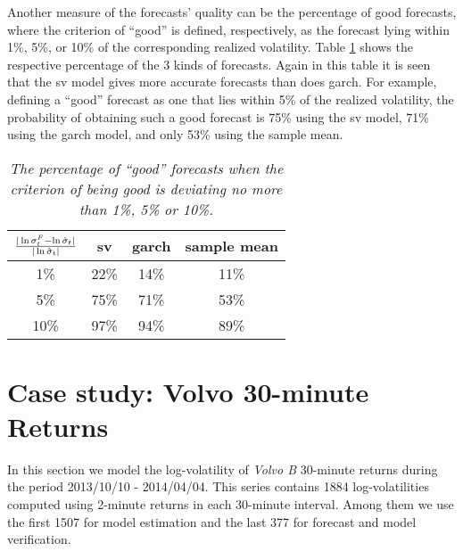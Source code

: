 Another measure of the forecasts' quality can be the percentage of good
forecasts, where the criterion of ``good'' is defined, respectively,
as the forecast lying within 1\%, 5\%, or 10\% of the corresponding
realized volatility. Table \ref{tab:nordea_2012_good} shows the
respective percentage of the 3 kinds of forecasts. Again in this table
it is seen that the \gls{sv} model gives more accurate forecasts than does
\gls{garch}. For example, defining a ``good'' forecast as one that lies
within 5\% of the realized volatility, the probability of obtaining
such a good forecast is 75\% using the \gls{sv} model, 71\% using the
\gls{garch} model, and only 53\% using the sample mean.
\begin{table}[htb!]
  \centering
  \begin{tabular}{|c|c|c|c|}
    \hline
    ${|\ln \sigma^F_t - \ln \hat{\sigma}_t| \over |\ln \hat{\sigma}_t|}$
    & \gls{sv} & \gls{garch} & sample mean \\
    \hline
    1\% & 22\% & 14\% & 11\% \\
    \hline
    5\% & 75\% & 71\% & 53\% \\
    \hline
    10\% & 97\% & 94\% & 89\% \\
    \hline
  \end{tabular}
  \caption{\small \it The percentage of ``good'' forecasts when the
    criterion of being good is deviating no more than 1\%, 5\% or
    10\%.}
  \label{tab:nordea_2012_good}
\end{table}

\section{Case study: Volvo 30-minute Returns}
\label{sec:volvo_30}
In this section we model the log-volatility of {\it Volvo B} 30-minute
returns during the period 2013/10/10 - 2014/04/04. This series
contains 1884 log-volatilities computed using 2-minute returns in each
30-minute interval. Among them we use the first 1507 for model
estimation and the last 377 for forecast and model verification.

